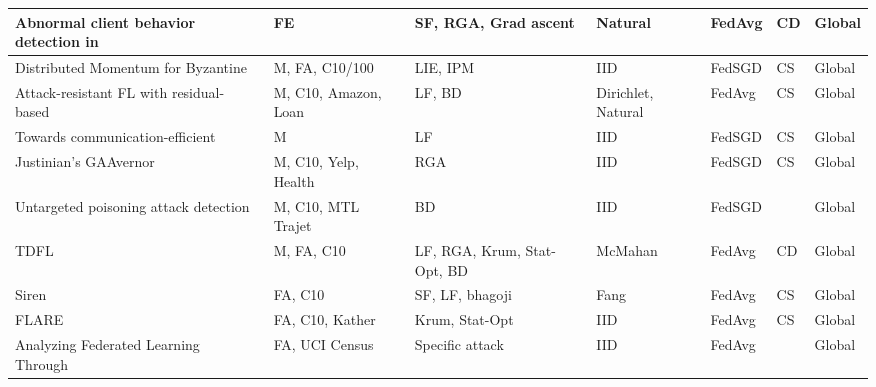 \begin{table*}[]
\begin{tabular}{|l|p{2cm}|p{2.7cm}|l|p{1.5cm}|p{.7cm}|l|}
Abnormal client behavior detection in~\cite{li2019abnormal}           & FE                   & SF, RGA, Grad ascent             & Natural                    & FedAvg                & CD               & Global              \\ \hline
Distributed Momentum for Byzantine~\cite{el2021distributed}              & M, FA, C10/100       & LIE, IPM                         & IID                        & FedSGD                & CS               & Global              \\ \hline
Attack-resistant FL with residual-based~\cite{fu2019attack}         & M, C10, Amazon, Loan & LF, BD                           & Dirichlet, Natural         & FedAvg                & CS               & Global              \\ \hline
Towards communication-efficient~\cite{liu2021towards}                 & M                    & LF                               & IID                        & FedSGD                & CS               & Global              \\ \hline
Justinian's GAAvernor~\cite{pan2020justinian}                           & M, C10, Yelp, Health & RGA                              & IID                        & FedSGD                & CS               & Global              \\ \hline
Untargeted poisoning attack detection~\cite{mallah2021untargeted}           & M, C10, MTL Trajet   & BD                               & IID                        & FedSGD                &                  & Global              \\ \hline
TDFL~\cite{xu2022tdfl}                                            & M, FA, C10           & LF, RGA, Krum, Stat-Opt, BD          & McMahan                    & FedAvg                & CD               & Global              \\ \hline
Siren~\cite{guo2021siren}                                           & FA, C10              & SF, LF, bhagoji                  & Fang                       & FedAvg                & CS               & Global              \\ \hline
FLARE~\cite{wang2022flare}                                           & FA, C10, Kather      & Krum, Stat-Opt                       & IID                        & FedAvg                & CS               & Global              \\ \hline
Analyzing Federated Learning Through~\cite{bhagoji2019analyzing}            & FA, UCI Census       & Specific attack                  & IID                        & FedAvg                &                  & Global              \\ \hline

\end{tabular}
\end{table*}
